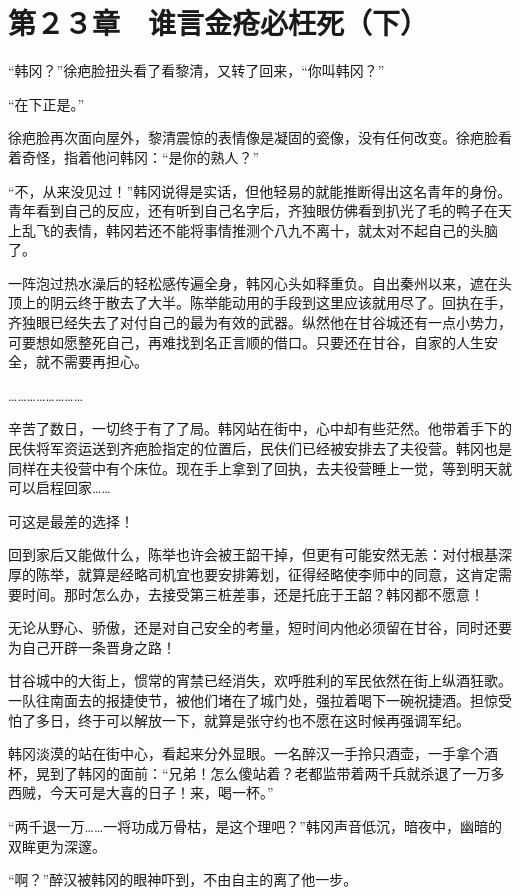 \section{第２３章　谁言金疮必枉死（下）}

“韩冈？”徐疤脸扭头看了看黎清，又转了回来，“你叫韩冈？”

“在下正是。”

徐疤脸再次面向屋外，黎清震惊的表情像是凝固的瓷像，没有任何改变。徐疤脸看着奇怪，指着他问韩冈：“是你的熟人？”

“不，从来没见过！”韩冈说得是实话，但他轻易的就能推断得出这名青年的身份。青年看到自己的反应，还有听到自己名字后，齐独眼仿佛看到扒光了毛的鸭子在天上乱飞的表情，韩冈若还不能将事情推测个八九不离十，就太对不起自己的头脑了。

一阵泡过热水澡后的轻松感传遍全身，韩冈心头如释重负。自出秦州以来，遮在头顶上的阴云终于散去了大半。陈举能动用的手段到这里应该就用尽了。回执在手，齐独眼已经失去了对付自己的最为有效的武器。纵然他在甘谷城还有一点小势力，可要想如愿整死自己，再难找到名正言顺的借口。只要还在甘谷，自家的人生安全，就不需要再担心。

……………………

辛苦了数日，一切终于有了了局。韩冈站在街中，心中却有些茫然。他带着手下的民伕将军资运送到齐疤脸指定的位置后，民伕们已经被安排去了夫役营。韩冈也是同样在夫役营中有个床位。现在手上拿到了回执，去夫役营睡上一觉，等到明天就可以启程回家……

可这是最差的选择！

回到家后又能做什么，陈举也许会被王韶干掉，但更有可能安然无恙：对付根基深厚的陈举，就算是经略司机宜也要安排筹划，征得经略使李师中的同意，这肯定需要时间。那时怎么办，去接受第三桩差事，还是托庇于王韶？韩冈都不愿意！

无论从野心、骄傲，还是对自己安全的考量，短时间内他必须留在甘谷，同时还要为自己开辟一条晋身之路！

甘谷城中的大街上，惯常的宵禁已经消失，欢呼胜利的军民依然在街上纵酒狂歌。一队往南面去的报捷使节，被他们堵在了城门处，强拉着喝下一碗祝捷酒。担惊受怕了多日，终于可以解放一下，就算是张守约也不愿在这时候再强调军纪。

韩冈淡漠的站在街中心，看起来分外显眼。一名醉汉一手拎只酒壶，一手拿个酒杯，晃到了韩冈的面前：“兄弟！怎么傻站着？老都监带着两千兵就杀退了一万多西贼，今天可是大喜的日子！来，喝一杯。”

“两千退一万……一将功成万骨枯，是这个理吧？”韩冈声音低沉，暗夜中，幽暗的双眸更为深邃。

“啊？”醉汉被韩冈的眼神吓到，不由自主的离了他一步。

